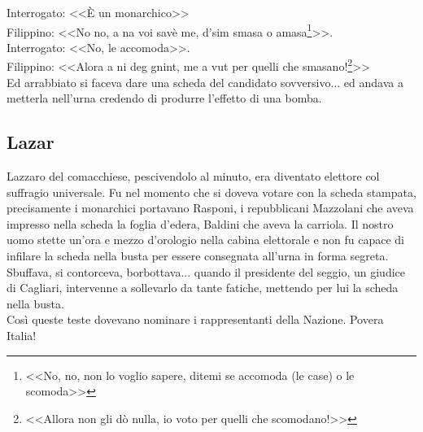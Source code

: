 \indent Interrogato: <<È un monarchico>>\\
\indent {}Filippino: <<No no, a na voi savè me, d'sim smasa o amasa\footnote{<<No, no, non lo voglio sapere, ditemi se accomoda (le case) o le scomoda>>}>>.\\
\indent Interrogato: <<No, le accomoda>>.\\
\indent {}Filippino: <<Alora a ni deg gnint, me a vut per quelli che smasano!\footnote{<<Allora non gli dò nulla, io voto per quelli che scomodano!>>}>>\\
\indent Ed arrabbiato si faceva dare una scheda del candidato sovversivo... ed andava a metterla nell'urna credendo di produrre l'effetto di una bomba.\\

\subsection{Lazar}
Lazzaro del comacchiese, pescivendolo al minuto, era diventato elettore col suffragio universale. Fu nel momento che si doveva votare con la scheda stampata, precisamente i monarchici portavano Rasponi, i repubblicani Mazzolani che aveva impresso nella scheda la foglia d'edera, Baldini che aveva la carriola. Il nostro uomo stette un'ora e mezzo d'orologio nella cabina elettorale e non fu capace di infilare la scheda nella busta per essere consegnata all'urna in forma segreta. Sbuffava, si contorceva, borbottava... quando il presidente del seggio, un giudice di Cagliari, intervenne a sollevarlo da tante fatiche, mettendo per lui la scheda nella busta.\\
\indent Così queste teste dovevano nominare i rappresentanti della Nazione. Povera Italia!


